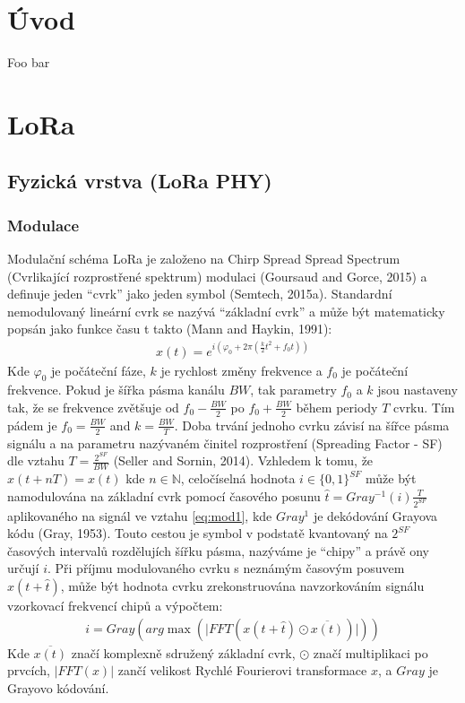 \documentclass{ctuthesis}
\begin{document}
\maketitle

\chapter{Úvod}

Foo bar

\chapter{LoRa}
\section{Fyzická vrstva (LoRa PHY)}
\subsection{Modulace}
Modulační schéma LoRa je založeno na Chirp Spread Spread Spectrum (Cvrlikající rozprostřené spektrum) modulaci  (Goursaud and Gorce, 2015) a definuje jeden “cvrk” jako jeden symbol  (Semtech, 2015a). Standardní nemodulovaný lineární cvrk se nazývá “základní cvrk” a může být matematicky popsán jako funkce času t takto (Mann and Haykin, 1991):
\begin{align}x(t)=e^{i(\varphi_{0}+2\pi(\frac{k}{2}t^{2} + f_{0}t))}
\label{eq:mod1}
\end{align}
Kde  $\varphi_{0}$ je počáteční fáze, $k$ je rychlost změny frekvence a $f_{0}$ je počáteční frekvence. Pokud je šířka pásma kanálu $BW$, tak parametry $f_{0}$ a $k$ jsou nastaveny tak, že se frekvence zvětšuje od $f_{0}-\frac{BW}{2}$ po $f_{0}+\frac{BW}{2}$ během periody $T$ cvrku. Tím pádem je $f_{0}=\frac{BW}{2}$ and $k = \frac{BW}{T}$. Doba trvání jednoho cvrku závisí na šířce pásma signálu a na parametru nazývaném činitel rozprostření (Spreading Factor - SF) dle vztahu $T = \frac{2^{SF}}{BW}$ (Seller and Sornin, 2014).
Vzhledem k tomu, že $x(t + nT) = x(t)$ kde $n\in \mathbb{N}$, celočíselná hodnota $i \in \{0, 1\}^{SF}$ může být namodulována na základní cvrk pomocí časového posunu $\hat{t} = Gray^{-1}(i)\frac{T}{2^{SF}}$ aplikovaného na signál ve vztahu \eqref{eq:mod1},  kde $Gray^{1}$ je dekódování Grayova kódu (Gray, 1953). Touto cestou je symbol v podstatě kvantovaný na $2^{SF}$ časových intervalů rozdělujích šířku pásma, nazýváme je “chipy” a právě ony určují $i$. Při příjmu modulovaného cvrku s neznámým časovým posuvem $x(t + \hat{t})$, může být hodnota cvrku zrekonstruována navzorkováním signálu vzorkovací frekvencí chipů a výpočtem:
\begin{align}i= Gray(arg \max (\lvert FFT(x(t+ \hat{t}) \odot \overline{x(t)}) \rvert ))
\label{eq:mod2}
\end{align}
Kde $\overline{x(t)}$ značí komplexně sdružený základní cvrk, $\odot$ značí multiplikaci po prvcích, $\lvert FFT(x) \rvert$ zančí velikost Rychlé Fourierovi transformace $x$, a $Gray$ je Grayovo kódování. 
\end{document}
